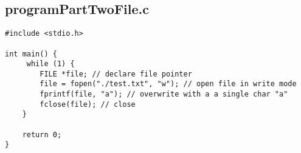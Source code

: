 \documentclass[11pt]{article}
\begin{document}
        
\subsection*{programPartTwoFile.c}
\begin{lstlisting}[style=ccode]
#include <stdio.h>

int main() {
     while (1) {
        FILE *file; // declare file pointer
        file = fopen("./test.txt", "w"); // open file in write mode 
        fprintf(file, "a"); // overwrite with a a single char "a"
        fclose(file); // close
    }

    return 0;
}
\end{lstlisting}
\end{document}

